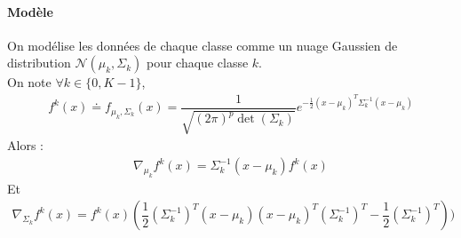 \documentclass[paper=a4, fontsize=11pt]{article}
\begin{document}
\paragraph{Modèle \\}
On modélise les données de chaque classe comme un nuage Gaussien de distribution $\mathcal{N}(\mu_k,\Sigma_k)$ pour chaque classe $k$. \\
On note $\forall k \in \lbrace 0,K-1 \rbrace$,
\begin{align*}
f^{k}(x) \doteq f_{\mu_k,\Sigma_k}(x) =\dfrac{1}{\sqrt{(2\pi)^{p}\det(\Sigma_k)}}e^{-\frac{1}{2}(x-\mu_k)^{T}\Sigma_{k}^{-1}(x-\mu_k)}
\end{align*}
Alors : 
\begin{align*}
\nabla_{\mu_k}f^{k}(x) = \Sigma_{k}^{-1}(x-\mu_k)f^{k}(x)
\end{align*}
Et 
\begin{align*}
\nabla_{\Sigma_k}f^{k}(x) = f^{k}(x)(\dfrac{1}{2}(\Sigma_k^{-1})^{T}(x-\mu_k)(x-\mu_k)^{T}(\Sigma_k^{-1})^{T} - \dfrac{1}{2}(\Sigma_k^{-1})^{T}))
\end{align*}
\end{document}
